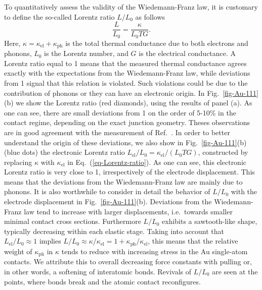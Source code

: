 \documentclass[aps,amsmath,amssymb,twocolumn,showpacs]{revtex4-1}
\begin{document}
To quantitatively assess the validity of the Wiedemann-Franz law, it is
customary to define the so-called Lorentz ratio $L/L_0$ as follows
%
\begin{equation}
  \frac{L}{L_0} = \frac{\kappa}{L_0TG} .
  \label{eq-Lorentz-ratio}
\end{equation}
%
Here, $\kappa=\kappa_{\text{el}}+\kappa_{\text{ph}}$ is the total thermal
conductance due to both electrons and phonons, $L_0$ is the Lorentz number,
and $G$ is the electrical conductance. A Lorentz ratio equal to 1 means that
the measured thermal conductance agrees exactly with the expectations from the
Wiedemann-Franz law, while deviations from 1 signal that this relation is
violated. Such violations could be due to the contribution of phonons or they
can have an electronic origin. In Fig.~\ref{fig-Au-111}(b) we show the Lorentz
ratio (red diamonds), using the results of panel (a). As one
can see, there are small deviations from 1 on the order of 5-10\% in the
contact regime, depending on the exact junction geometry. Theses observations
are in good agreement with the measurement of Ref.~. In
order to better understand the origin of these deviations, we also show in
Fig.~\ref{fig-Au-111}(b) (blue dots) the electronic Lorentz ratio
$L_{\text{el}}/L_0=\kappa_{\text{el}}/(L_0TG)$, constructed by replacing
$\kappa$ with $\kappa_{\text{el}}$ in Eq.~(\ref{eq-Lorentz-ratio}). As one can
see, this electronic Lorentz ratio is very close to 1, irrespectively of the
electrode displacement. This means that the deviations from the
Wiedemann-Franz law are mainly due to phonons. It is also worthwhile to
consider in detail the behavior of $L/L_0$ with the electrode displacement in
Fig.~\ref{fig-Au-111}(b). Deviations from the Wiedemann-Franz law tend to
increase with larger displacements, i.e.\ towards smaller minimal contact
cross sections. Furthermore $L/L_0$ exhibits a sawtooth-like shape, typically
decreasing within each elastic stage. Taking into account that
$L_{\text{el}}/L_0\approx 1$ implies $L/L_0\approx
\kappa/\kappa_{\text{el}}=1+\kappa_{\text{ph}}/\kappa_{\text{el}}$, this
means that the relative weight of $\kappa_{\text{ph}}$ in $\kappa$ tends to
reduce with increasing stress in the Au single-atom contacts. We attribute
this to overall decreasing force constants with pulling or, in other words, a
softening of interatomic bonds. Revivals of $L/L_0$ are seen at the points,
where bonds break and the atomic contact reconfigures.
\end{document}
